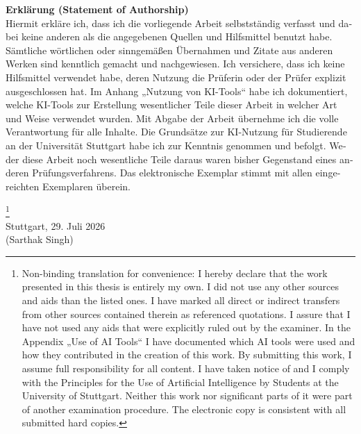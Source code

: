 \documentclass[12pt,leqno,a4paper]{article}
\begin{document}
\newpage
\thispagestyle{empty}

\begin{otherlanguage}{german}
\noindent\textbf{Erklärung (Statement of Authorship)}\\

\noindent Hiermit erkläre ich, dass ich die vorliegende Arbeit selbstständig verfasst und dabei keine anderen als die angegebenen Quellen und Hilfsmittel benutzt habe. Sämtliche wörtlichen oder sinngemäßen Übernahmen und Zitate aus anderen Werken sind kenntlich gemacht und nachgewiesen. Ich versichere, dass ich keine Hilfsmittel verwendet habe, deren Nutzung die Prüferin oder der Prüfer explizit ausgeschlossen hat. Im Anhang „Nutzung von KI-Tools“ habe ich dokumentiert, welche KI-Tools zur Erstellung wesentlicher Teile dieser Arbeit in welcher Art und Weise verwendet wurden. Mit Abgabe der Arbeit übernehme ich die volle Verantwortung für alle Inhalte. Die Grundsätze zur KI-Nutzung für Studierende an der Universität Stuttgart habe ich zur Kenntnis genommen und befolgt. Weder diese Arbeit noch wesentliche Teile daraus waren bisher Gegenstand eines anderen Prüfungsverfahrens. Das elektronische Exemplar stimmt mit allen eingereichten Exemplaren überein.
\end{otherlanguage}
\footnote{Non-binding translation for convenience: I hereby declare that the work presented in this thesis is entirely my own. I did not use any other sources and aids than the listed ones. I have marked all direct or indirect transfers from other sources contained therein as referenced quotations. I assure that I have not used any aids that were explicitly ruled out by the examiner. In the Appendix „Use of AI Tools“ I have documented which AI tools were used and how they contributed in the creation of this work. By submitting this work, I assume full responsibility for all content. I have taken notice of and I comply with the Principles for the Use of Artificial Intelligence by Students at the University of Stuttgart. Neither this work nor significant parts of it were part of another examination procedure. The electronic copy is consistent with all submitted hard copies.}\\[2cm]

\noindent Stuttgart, 29. Juli 2026\\[1.5cm]
\noindent (Sarthak Singh)
\end{document}
